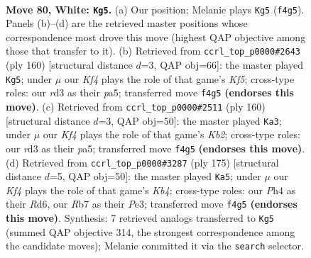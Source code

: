 \documentclass[11pt]{article}
\begin{document}
\clearpage

\begin{figure}[p]\centering
\begin{subfigure}{0.46\textwidth}\centering
\resizebox{\linewidth}{!}{%
\newchessgame
\chessboard[
  setfen={7k/1R6/8/8/2r2K1P/3r4/8/8 w - - 1 80},
  showmover=false,
  pgfstyle=straightmove, color=movearrow, markmove={f4-g5}
]}
\caption{}
\end{subfigure}\hfill
\begin{subfigure}{0.46\textwidth}\centering
\resizebox{\linewidth}{!}{%
\newchessgame
\chessboard[
  setfen={8/4k3/8/p4K2/7P/3R4/5r2/8 w - - 10 81},
  showmover=false,
  pgfstyle=straightmove, color=movearrow, markmove={f5-g5}
]}
\caption{}
\end{subfigure}
\\[4pt]
\begin{subfigure}{0.46\textwidth}\centering
\resizebox{\linewidth}{!}{%
\newchessgame
\chessboard[
  setfen={8/k1P5/6R1/p7/8/8/1K3r2/8 w - - 1 81},
  showmover=false,
  pgfstyle=straightmove, color=movearrow, markmove={b2-a3}
]}
\caption{}
\end{subfigure}\hfill
\begin{subfigure}{0.46\textwidth}\centering
\resizebox{\linewidth}{!}{%
\newchessgame
\chessboard[
  setfen={8/8/3r4/1k6/8/4p1K1/4P3/1R6 b - - 19 88},
  showmover=false,
  pgfstyle=straightmove, color=movearrow, markmove={b5-a5}
]}
\caption{}
\end{subfigure}
\caption{\textbf{Move 80, White: \texttt{Kg5}.} (a) Our position; Melanie plays \texttt{Kg5} (\texttt{f4g5}). Panels (b)--(d) are the retrieved master positions whose correspondence most drove this move (highest QAP objective among those that transfer to it). (b) Retrieved from \texttt{ccrl\_top\_p0000\#2643} (ply 160) [structural distance $d$=3, QAP obj=66]: the master played \texttt{Kg5}; under $\mu$ our \emph{Kf4} plays the role of that game's \emph{Kf5}; cross-type roles: our \emph{r}d3 as their \emph{p}a5; transferred move \texttt{f4g5} \textbf{(endorses this move)}. (c) Retrieved from \texttt{ccrl\_top\_p0000\#2511} (ply 160) [structural distance $d$=3, QAP obj=50]: the master played \texttt{Ka3}; under $\mu$ our \emph{Kf4} plays the role of that game's \emph{Kb2}; cross-type roles: our \emph{r}d3 as their \emph{p}a5; transferred move \texttt{f4g5} \textbf{(endorses this move)}. (d) Retrieved from \texttt{ccrl\_top\_p0000\#3287} (ply 175) [structural distance $d$=5, QAP obj=50]: the master played \texttt{Ka5}; under $\mu$ our \emph{Kf4} plays the role of that game's \emph{Kb4}; cross-type roles: our \emph{P}h4 as their \emph{R}d6, our \emph{R}b7 as their \emph{P}e3; transferred move \texttt{f4g5} \textbf{(endorses this move)}. Synthesis: 7 retrieved analogs transferred to \texttt{Kg5} (summed QAP objective 314, the strongest correspondence among the candidate moves); Melanie committed it via the \texttt{search} selector.}
\label{fig:thought-m158}
\end{figure}
\end{document}
